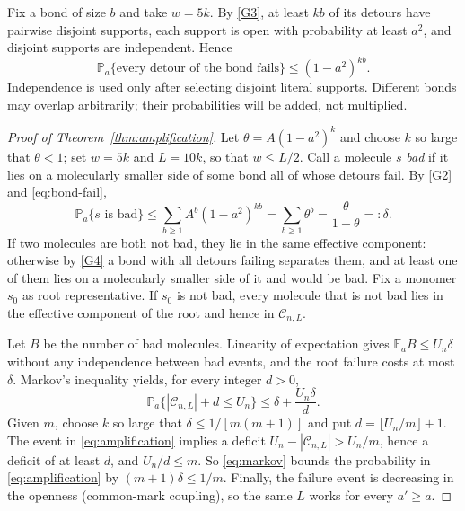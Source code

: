 \documentclass[11pt,reqno]{amsart}
\theoremstyle{plain}
\theoremstyle{definition}
\theoremstyle{remark}
\numberwithin{equation}{section}
\newcommand{\Prob}{\mathbb{P}}
\newcommand{\Ex}{\mathbb{E}}
\newcommand{\cC}{\mathcal{C}}
\begin{document}
Fix a bond of size $b$ and take $w=5k$. By \ref{G3}, at least $kb$ of its detours have pairwise disjoint supports, each support is open with probability at least $a^2$, and disjoint supports are independent. Hence
\begin{equation}\label{eq:bond-fail}
\Prob_a\{\text{every detour of the bond fails}\}\le(1-a^2)^{kb}.
\end{equation}
Independence is used only after selecting disjoint literal supports. Different bonds may overlap arbitrarily; their probabilities will be added, not multiplied.

\begin{proof}[Proof of Theorem~\ref{thm:amplification}]
Let $\theta=A(1-a^2)^k$ and choose $k$ so large that $\theta<1$; set $w=5k$ and $L=10k$, so that $w\le L/2$. Call a molecule $s$ \emph{bad} if it lies on a molecularly smaller side of some bond all of whose detours fail. By \ref{G2} and \eqref{eq:bond-fail},
\begin{equation}\label{eq:bad}
\Prob_a\{s\text{ is bad}\}\le\sum_{b\ge1}A^b(1-a^2)^{kb}=\sum_{b\ge1}\theta^b=\frac{\theta}{1-\theta}=:\delta .
\end{equation}
If two molecules are both not bad, they lie in the same effective component: otherwise by \ref{G4} a bond with all detours failing separates them, and at least one of them lies on a molecularly smaller side of it and would be bad. Fix a monomer $s_0$ as root representative. If $s_0$ is not bad, every molecule that is not bad lies in the effective component of the root and hence in $\cC_{n,L}$.

Let $B$ be the number of bad molecules. Linearity of expectation gives $\Ex_aB\le U_n\delta$ without any independence between bad events, and the root failure costs at most $\delta$. Markov's inequality yields, for every integer $d>0$,
\begin{equation}\label{eq:markov}
\Prob_a\{|\cC_{n,L}|+d\le U_n\}\le\delta+\frac{U_n\delta}{d}.
\end{equation}
Given $m$, choose $k$ so large that $\delta\le1/[m(m+1)]$ and put $d=\lfloor U_n/m\rfloor+1$. The event in \eqref{eq:amplification} implies a deficit $U_n-|\cC_{n,L}|>U_n/m$, hence a deficit of at least $d$, and $U_n/d\le m$. So \eqref{eq:markov} bounds the probability in \eqref{eq:amplification} by $(m+1)\delta\le1/m$. Finally, the failure event is decreasing in the openness (common-mark coupling), so the same $L$ works for every $a'\ge a$.
\end{proof}
\end{document}
